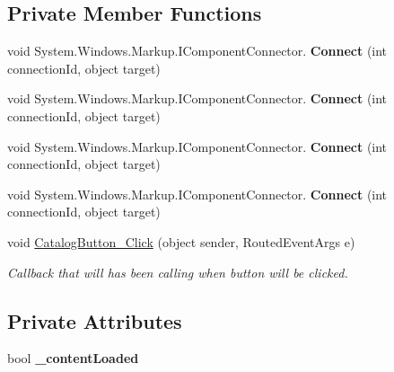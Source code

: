 \subsection*{Private Member Functions}
\begin{DoxyCompactItemize}
\item 
\mbox{\label{class_wpf_handler_1_1_u_i_1_1_controls_1_1_catalog_button_a8b8d46e0277bc37fa5b44878ff08227d}} 
void System.\+Windows.\+Markup.\+I\+Component\+Connector. {\bfseries Connect} (int connection\+Id, object target)
\item 
\mbox{\label{class_wpf_handler_1_1_u_i_1_1_controls_1_1_catalog_button_a8b8d46e0277bc37fa5b44878ff08227d}} 
void System.\+Windows.\+Markup.\+I\+Component\+Connector. {\bfseries Connect} (int connection\+Id, object target)
\item 
\mbox{\label{class_wpf_handler_1_1_u_i_1_1_controls_1_1_catalog_button_a8b8d46e0277bc37fa5b44878ff08227d}} 
void System.\+Windows.\+Markup.\+I\+Component\+Connector. {\bfseries Connect} (int connection\+Id, object target)
\item 
\mbox{\label{class_wpf_handler_1_1_u_i_1_1_controls_1_1_catalog_button_a8b8d46e0277bc37fa5b44878ff08227d}} 
void System.\+Windows.\+Markup.\+I\+Component\+Connector. {\bfseries Connect} (int connection\+Id, object target)
\item 
void \mbox{\hyperlink{class_wpf_handler_1_1_u_i_1_1_controls_1_1_catalog_button_af586051be4f757942d42f6b3825a9aa0}{Catalog\+Button\+\_\+\+Click}} (object sender, Routed\+Event\+Args e)
\begin{DoxyCompactList}\small\item\em Callback that will has been calling when button will be clicked. \end{DoxyCompactList}\end{DoxyCompactItemize}
\subsection*{Private Attributes}
\begin{DoxyCompactItemize}
\item 
\mbox{\label{class_wpf_handler_1_1_u_i_1_1_controls_1_1_catalog_button_ae16854f2ac8f8bccd5b7e9566815ab54}} 
bool {\bfseries \+\_\+content\+Loaded}
\end{DoxyCompactItemize}


